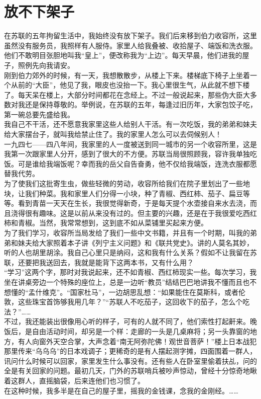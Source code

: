 \fancyhead[RO]{} %
\fancyhead[LE]{} %
\chapter*{放不下架子}
\thispagestyle{empty}
在苏联的五年拘留生活中，我始终没有放下架子。我们后来移到伯力收容所，这里虽然没有服务员，我照样有人服侍。家里人给我叠被、收拾屋子、端饭和洗衣服。他们不敢明目张胆地叫我“皇上”，便改称我为“上边”。每天早晨，他们进我的屋子，照例先向我请安。\\

刚到伯力郊外的时候，有一天，我想散散步，从楼上下来。楼梯底下椅子上坐着一个从前的“大臣”，他见了我，眼皮也没抬一下。我心里很生气，从此就不想下楼了。每天呆在楼上，大部分时间都花在念经上。不过一般说起来，那些伪大臣大多数对我还是保持尊敬的。举例说，在苏联的五年，每逢过旧历年，大家包饺子吃，第一碗总要先盛给我。\\

我自己不干活，还不愿意我家里这些人给别人干活。有一次吃饭，我的弟弟和妹夫给大家摆台子，就叫我给禁止住了。我的家里人怎么可以去伺候别人！\\

一九四七——四八年间，我家里的人一度被送到同一城市的另一个收容所里，这是我第一次跟家里人分开，感到了很大的不方便。苏联当局很照顾我，容许我单独吃饭。可是谁给我端饭呢？幸而我的岳父自告奋勇，他不仅给我端饭，连洗衣服都愿替我代劳。\\

为了使我们这批寄生虫，做些轻微的劳动，收容所给我们在院子里划出了一些地块，让我们种菜。我和家里人们分得一小块，种了青椒、西红柿、茄子、扁豆等等。看到青苗一天天在生长，我很觉得新奇，于是每天提个水壶接自来水去浇，而且浇得很有趣味。这是以前从来没有过的。但主要的兴趣，还是在于我很爱吃西红柿和青椒。当然，我常常想到，这到底不如从菜铺里买起来方便。\\

为了我们学习，收容所当局发给了我们一些中文书籍，并且有一个时期，叫我的弟弟和妹夫给大家照着本子讲《列宁主义问题》和《联共党史》。讲的人莫名其妙，听的人也胡里胡涂。我自己心里只是纳闷，这和我有什么关系？假如不让我留在苏联，还要把我送回去，我就是能背下这两本书，又有什么用？\\

“学习”这两个字，那时对我说起来，还不如青椒、西红柿现实一些。每次学习，我坐在讲桌旁边一个特殊的座位上，总是一边听“教员”结结巴巴地讲我不懂而且也不想懂的“孟什维克”。“国家杜马”，一边胡思乱想：“如果能住在莫斯科，或者伦敦，这些珠宝首饰够我用几年？”“苏联人不吃茄子，这回收下的茄子，怎么个吃法？”……\\

不过，我还能装出很像用心听的样子，可有的人就不同了，他们索性打起鼾来。晚饭后，是自由活动时间，却另是一个样：走廊的一头是几桌麻将；另一头靠窗的地方，有人向窗外天空合掌，大声念着“南无阿弥陀佛！观世音菩萨！”楼上日本战犯那里传来“乌乌乌”的日本戏调子；更稀奇的是有人摆起测字摊，四面围着一群人，讯问什么时候可以回家，家里发生什么事没有。还有些人在卧室里偷着扶乩，问的全是有关回家的问题。最初几天，门外的苏联哨兵被吵声惊动，曾经十分惊奇地瞅着这群人，直摇脑袋，后来连他们也习惯了。\\

在这种时候，我多半是在自己的屋子里，摇我的金钱课，念我的金刚经。……\\